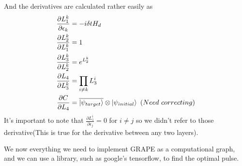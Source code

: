 \documentclass[english, a4paper, 12pt, twoside]{article}
\numberwithin{equation}{section} %
\begin{document}
And the derivatives are calculated rather easily as
\begin{align*}
    \frac{\partial L_1^k}{\partial \epsilon_k} &= -i \delta t H_d\\
    \frac{\partial L_2^k}{\partial L_1^k} &= 1 \\
    \frac{\partial L_3^k}{\partial L_2^k} &= e^{L_2^k} \\
    \frac{\partial L_4}{\partial L_3^k} &= \prod_{i \ne k} L_3^i \\
    \frac{\partial C}{\partial L_4} &= \overline{\ket{\psi_{target}}} \otimes \ket{\psi_{initial}}\ (Need\ correcting)
\end{align*}
It's important to note that $\frac{\partial L_1^i}{\partial \epsilon_j} = 0$ for $i \ne j$ so we didn't refer to those derivative(This is true for the derivative between any two layers).

We now everything we need to implement GRAPE as a computational graph, and we can use a library, such as google's tensorflow, to find the optimal pulse.

\end{document}
